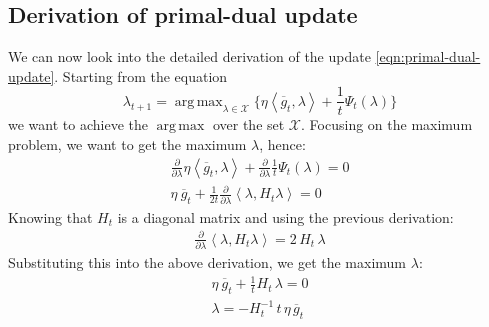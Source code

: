 \documentclass[notitlepage]{article}
\DeclareMathOperator*{\argmax}{arg\,max}
\begin{document}

\subsection{Derivation of primal-dual update}
We can now look into the detailed derivation of the update \eqref{eqn:primal-dual-update}. Starting from the equation
\[
  \lambda_{t+1} = \argmax_{\lambda \in \mathcal{X}} \{ \eta \left\langle \overline{g}_t,\lambda \right\rangle + \frac{1}{t} \Psi_t(\lambda) \} 
\]
we want to achieve the $\argmax$ over the set $\mathcal{X}$. Focusing on the maximum problem, we want to get the maximum $\lambda$, hence:
\begin{align*}
  \frac{\partial}{\partial \lambda} \eta \left\langle \overline{g}_t,\lambda \right\rangle + \frac{\partial}{\partial \lambda} \frac{1}{t} \Psi_t(\lambda) = 0 \\
  \eta\ \overline{g}_t + \frac{1}{2t} \frac{\partial}{\partial \lambda} \left\langle \lambda,H_t \lambda \right\rangle = 0 
\end{align*}  
Knowing that $H_t$ is a diagonal matrix and using the previous derivation:
\begin{align*}
  \frac{\partial}{\partial \lambda} \left\langle \lambda, H_t \lambda \right\rangle = 2\, H_t\, \lambda
\end{align*}
Substituting this into the above derivation, we get the maximum $\lambda$:
\begin{align*}
  \eta\ \overline{g}_t + \frac{1}{t} H_t\, \lambda = 0 \\
  \lambda = - H_t^{-1}\, t\, \eta\, \overline{g}_t
\end{align*}
\end{document}
